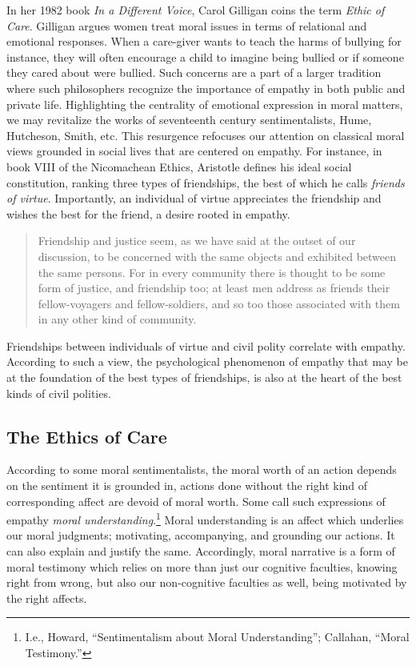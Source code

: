 \documentclass[phdthesis,12pt,final]{wuthesis}
\theoremstyle{definition}
\theoremstyle{definition}
\theoremstyle{definition}
\theoremstyle{definition}
\theoremstyle{remark}
\begin{document}
In her 1982 book \emph{In a Different Voice}, Carol Gilligan coins the term \emph{Ethic of Care}. Gilligan argues women treat moral issues in terms of relational and emotional responses. When a care-giver wants to teach the harms of bullying for instance, they will often encourage a child to imagine being bullied or if someone they cared about were bullied. Such concerns are a part of a larger tradition where such philosophers recognize the importance of empathy in both public and private life. Highlighting the centrality of emotional expression in moral matters, we may revitalize the works of seventeenth century sentimentalists, Hume, Hutcheson, Smith, etc. This resurgence refocuses our attention on classical moral views grounded in social lives that are centered on empathy. For instance, in book VIII of the Nicomachean Ethics, Aristotle defines his ideal social constitution, ranking three types of friendships, the best of which he calls \emph{friends of virtue}. Importantly, an individual of virtue appreciates the friendship and wishes the best for the friend, a desire rooted in empathy.

\begin{quote}
Friendship and justice seem, as we have said at the outset of our discussion, to be concerned with the same objects and exhibited between the same persons. For in every community there is thought to be some form of justice, and friendship too; at least men address as friends their fellow-voyagers and fellow-soldiers, and so too those associated with them in any other kind of community.
\end{quote}

Friendships between individuals of virtue and civil polity correlate with empathy. According to such a view, the psychological phenomenon of empathy that may be at the foundation of the best types of friendships, is also at the heart of the best kinds of civil polities.

\subsection*{The Ethics of Care}\label{the-ethics-of-care}

According to some moral sentimentalists, the moral worth of an action depends on the sentiment it is grounded in, actions done without the right kind of corresponding affect are devoid of moral worth. Some call such expressions of empathy \emph{moral understanding}.\footnote{I.e., Howard, {``Sentimentalism about {Moral Understanding}''}; Callahan, {``Moral {Testimony}.''}} Moral understanding is an affect which underlies our moral judgments; motivating, accompanying, and grounding our actions. It can also explain and justify the same. Accordingly, moral narrative is a form of moral testimony which relies on more than just our cognitive faculties, knowing right from wrong, but also our non-cognitive faculties as well, being motivated by the right affects.
\end{document}
